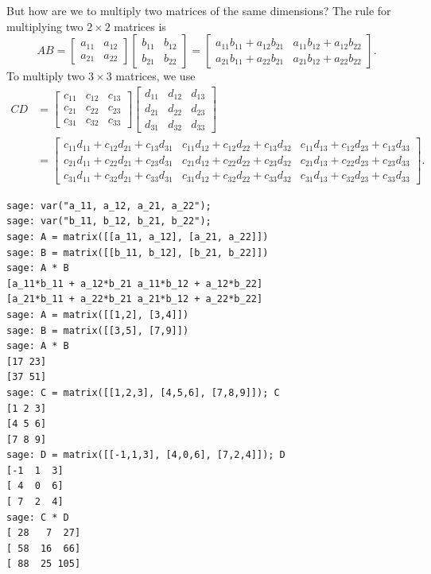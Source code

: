 But how are we to multiply two matrices of the same dimensions? The
rule for multiplying two $2 \times 2$ matrices is
\[
AB
=
\begin{bmatrix}
a_{11} & a_{12} \\
a_{21} & a_{22}
\end{bmatrix}
%
\begin{bmatrix}
b_{11} & b_{12} \\
b_{21} & b_{22}
\end{bmatrix}
=
\begin{bmatrix}
a_{11} b_{11} + a_{12} b_{21} & a_{11} b_{12} + a_{12} b_{22} \\
a_{21} b_{11} + a_{22} b_{21} & a_{21} b_{12} + a_{22} b_{22}
\end{bmatrix}.
\]
To multiply two $3 \times 3$ matrices, we use
%
\begin{align*}
CD
&=
\begin{bmatrix}
c_{11} & c_{12} & c_{13} \\
c_{21} & c_{22} & c_{23} \\
c_{31} & c_{32} & c_{33}
\end{bmatrix}
%
\begin{bmatrix}
d_{11} & d_{12} & d_{13} \\
d_{21} & d_{22} & d_{23} \\
d_{31} & d_{32} & d_{33}
\end{bmatrix} \\[4pt]
&=
\begin{bmatrix}
c_{11} d_{11} + c_{12} d_{21} + c_{13} d_{31} &
c_{11} d_{12} + c_{12} d_{22} + c_{13} d_{32} &
c_{11} d_{13} + c_{12} d_{23} + c_{13} d_{33} \\
%
c_{21} d_{11} + c_{22} d_{21} + c_{23} d_{31} &
c_{21} d_{12} + c_{22} d_{22} + c_{23} d_{32} &
c_{21} d_{13} + c_{22} d_{23} + c_{23} d_{33} \\
c_{31} d_{11} + c_{32} d_{21} + c_{33} d_{31} &
c_{31} d_{12} + c_{32} d_{22} + c_{33} d_{32} &
c_{31} d_{13} + c_{32} d_{23} + c_{33} d_{33}
\end{bmatrix}.
\end{align*}

\begin{lstlisting}
sage: var("a_11, a_12, a_21, a_22");
sage: var("b_11, b_12, b_21, b_22");
sage: A = matrix([[a_11, a_12], [a_21, a_22]])
sage: B = matrix([[b_11, b_12], [b_21, b_22]])
sage: A * B
[a_11*b_11 + a_12*b_21 a_11*b_12 + a_12*b_22]
[a_21*b_11 + a_22*b_21 a_21*b_12 + a_22*b_22]
sage: A = matrix([[1,2], [3,4]])
sage: B = matrix([[3,5], [7,9]])
sage: A * B
[17 23]
[37 51]
sage: C = matrix([[1,2,3], [4,5,6], [7,8,9]]); C
[1 2 3]
[4 5 6]
[7 8 9]
sage: D = matrix([[-1,1,3], [4,0,6], [7,2,4]]); D
[-1  1  3]
[ 4  0  6]
[ 7  2  4]
sage: C * D
[ 28   7  27]
[ 58  16  66]
[ 88  25 105]
\end{lstlisting}

